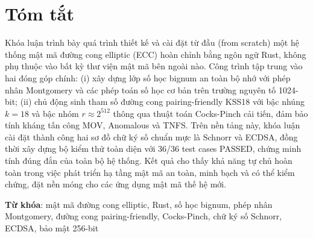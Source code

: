 
\clearpage
{}

\chapter*{Tóm tắt}

Khóa luận trình bày quá trình thiết kế và cài đặt từ đầu (from scratch)
một hệ thống mật mã đường cong elliptic (ECC) hoàn chỉnh bằng ngôn ngữ
Rust, không phụ thuộc vào bất kỳ thư viện mật mã bên ngoài nào. Công
trình tập trung vào hai đóng góp chính: (i) xây dựng lớp số học bignum
an toàn bộ nhớ với phép nhân Montgomery và các phép toán số học cơ bản
trên trường nguyên tố 1024-bit; (ii) chủ động sinh tham số đường cong
pairing-friendly KSS18 với bậc nhúng \(k=18\) và bậc nhóm
\(r \approx 2^{512}\) thông qua thuật toán Cocks-Pinch cải tiến, đảm bảo
tính kháng tấn công MOV, Anomalous và TNFS. Trên nền tảng này, khóa luận
cài đặt thành công hai sơ đồ chữ ký số chuẩn mực là Schnorr và ECDSA,
đồng thời xây dựng bộ kiểm thử toàn diện với 36/36 test cases PASSED,
chứng minh tính đúng đắn của toàn bộ hệ thống. Kết quả cho thấy khả năng
tự chủ hoàn toàn trong việc phát triển hạ tầng mật mã an toàn, minh bạch
và có thể kiểm chứng, đặt nền móng cho các ứng dụng mật mã thế hệ mới.

\textbf{Từ khóa}: mật mã đường cong elliptic, Rust, số học bignum, phép
nhân Montgomery, đường cong pairing-friendly, Cocks-Pinch, chữ ký số
Schnorr, ECDSA, bảo mật 256-bit

\FloatBarrier
